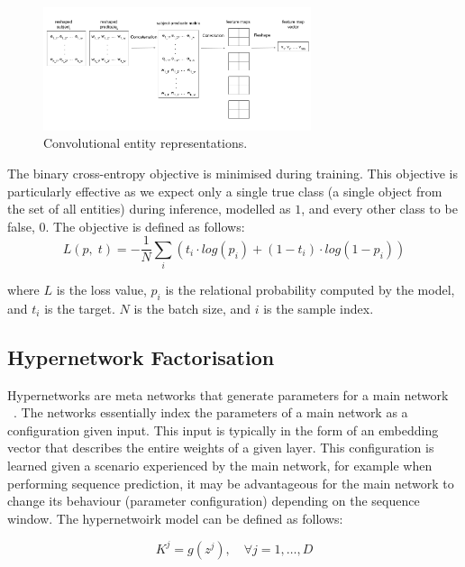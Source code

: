 \begin{figure}[H]
   	\centering
    	\includegraphics[width=0.7\textwidth, height=0.4\textwidth]{convolutional_entity_representations}
	\caption{Convolutional entity representations.}
\end{figure}

\noindent The binary cross-entropy objective is minimised during training. This objective is particularly effective as we expect only a single true class (a single object from the set of all entities) during inference, modelled as $1$, and every other class to be false, $0$. The objective is defined as follows:
\begin{equation}
	L(p, \; t) =  -\frac{1}{N}\sum_i(t_i \cdot log(p_i) + (1 - t_i) \cdot log(1 - p_i))
\end{equation}

\noindent where $ L $ is the loss value, $ p_i $ is the relational probability computed by the model, and $ t_i $ is the target. $ N $ is the batch size, and $ i $ is the sample index.

\subsection{Hypernetwork Factorisation}

Hypernetworks are meta networks that generate parameters for a main network ~\citep{ha2016hypernetworks}. The networks essentially index the parameters of a main network as a configuration given input. This input is typically in the form of an embedding vector that describes the entire weights of a given layer. This configuration is learned given a scenario experienced by the main network, for example when performing sequence prediction, it may be advantageous for the main network to change its behaviour (parameter configuration) depending on the sequence window. The hypernetwoirk model can be defined as follows: 

\begin{equation}
	K^j = g(z^j), \quad \forall j = 1, \dots, D
\end{equation}

